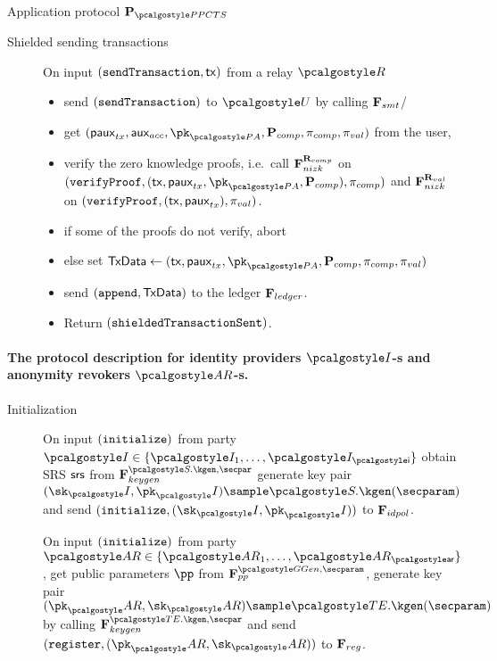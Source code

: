 \documentclass[runningheads,10pt]{llncs}
\numberwithin{equation}{section}
\begin{document}
\begin{protbox}{Application protocol $\prot{\PPCTS}$}
\begin{description}
  \item[Shielded sending transactions] On input $(\mathtt{sendTransaction}, \mathsf{tx})$ from a
    relay $\relay$
    \begin{itemize}
    \item send $(\mathtt{sendTransaction})$ to $\user$ by calling $\mathbf{F}_{{smt}}$/
    \item get $(\pauxtx, \auxacc, \pk_{\polas}, \comppolicy, \zkproof_{comp},
      \zkproof_{val})$ from the user,
    \item verify the zero knowledge proofs, i.e.~call $\mathbf{F}_{{nizk}}^{\mathbf{R}_{comp}}$ on
      $(\verifyProof, (\tx, \pauxtx, \pk_{\polas}, \comppolicy),
      \zkproof_{comp})$ and $\mathbf{F}_{{nizk}}^{\mathbf{R}_{val}}$ on $(\mathtt{verifyProof}, (\mathsf{tx},
      \mathsf{paux}_{tx}), \mathsf{\pi}_{val})$.
    \item if some of the proofs do not verify, abort
    \item else set $\txdata \gets (\tx, \pauxtx, \pk_{\polas}, \comppolicy,
      \zkproof_{comp}, \zkproof_{val})$
    \item send $(\mathtt{append}, \mathsf{TxData})$ to the ledger $\mathbf{F}_{{ledger}}$.
    \item Return $(\mathtt{shieldedTransactionSent})$.
    \end{itemize}
  \end{description}

  \paragraph{The protocol description for identity providers $\idprov$-s and
    anonymity revokers $\ar$-s.}
  \begin{description}
  \item[Initialization] On input $(\mathtt{initialize})$ from party $\idprov \in
    \smallset{\idprov_1, \ldots, \idprov_\noofidprov}$ obtain SRS $\mathsf{srs}$ from
    $\func{keygen}^{\SIG.\kgen, \secpar}$ generate key pair $(\sk_\idprov,
    \pk_\idprov) \sample \SIG.\kgen(\secparam)$ and send $(\initialize,
    (\sk_\idprov, \pk_\idprov))$ to $\mathbf{F}_{{idpol}}$.

    On input $(\mathtt{initialize})$ from party $\ar \in \smallset{\ar_1, \ldots,
    \ar_\noofar}$, get public parameters $\pp$ from $\func{pp}^{\ggen,
    \secparam}$, generate key pair $(\pk_\ar, \sk_\ar) \sample
    \TENC.\kgen(\secparam)$ by calling $\func{keygen}^{\TENC.\kgen, \secpar}$
    and send $(\register, (\pk_\ar, \sk_\ar))$ to $\mathbf{F}_{{reg}}$.


\end{description}
\end{protbox}
\end{document}
